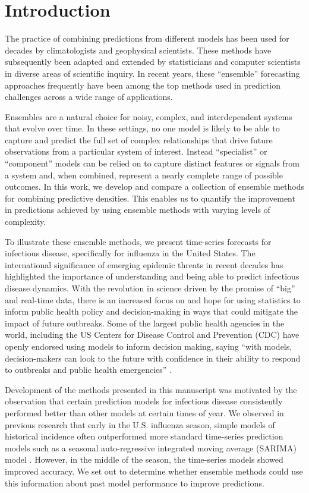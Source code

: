 \documentclass[10pt,letterpaper]{article}
\begin{document}
\section{Introduction}\label{introduction}

The practice of combining predictions from different models has been
used for decades by climatologists and geophysical scientists. These
methods have subsequently been adapted and extended by statisticians and
computer scientists in diverse areas of scientific inquiry. In recent
years, these ``ensemble'' forecasting approaches frequently have been
among the top methods used in prediction challenges across a wide range
of applications.

Ensembles are a natural choice for noisy, complex, and interdependent
systems that evolve over time. In these settings, no one model is likely
to be able to capture and predict the full set of complex relationships
that drive future observations from a particular system of interest.
Instead ``specialist'' or ``component'' models can be relied on to
capture distinct features or signals from a system and, when combined,
represent a nearly complete range of possible outcomes. In this work, we
develop and compare a collection of ensemble methods for combining
predictive densities. This enables us to quantify the improvement in
predictions achieved by using ensemble methods with varying levels of
complexity.

To illustrate these ensemble methods, we present time-series forecasts
for infectious disease, specifically for influenza in the United States.
The international significance of emerging epidemic threats in recent
decades has highlighted the importance of understanding and being able
to predict infectious disease dynamics. With the revolution in science
driven by the promise of ``big'' and real-time data, there is an
increased focus on and hope for using statistics to inform public health
policy and decision-making in ways that could mitigate the impact of
future outbreaks. Some of the largest public health agencies in the
world, including the US Centers for Disease Control and Prevention (CDC)
have openly endorsed using models to inform decision making, saying
``with models, decision-makers can look to the future with confidence in
their ability to respond to outbreaks and public health emergencies''
\cite{cdc-decisions-2016}.

Development of the methods presented in this manuscript was motivated by
the observation that certain prediction models for infectious disease
consistently performed better than other models at certain times of
year. We observed in previous research that early in the U.S. influenza
season, simple models of historical incidence often outperformed more
standard time-series prediction models such as a seasonal
auto-regressive integrated moving average (SARIMA) model
\cite{ReichLabGitHubDiseasePredWithKCDEPackage}. However, in the middle
of the season, the time-series models showed improved accuracy. We set
out to determine whether ensemble methods could use this information
about past model performance to improve predictions.
\end{document}
